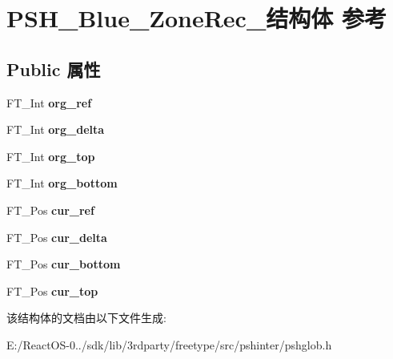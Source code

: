 \hypertarget{struct_p_s_h___blue___zone_rec__}{}\section{P\+S\+H\+\_\+\+Blue\+\_\+\+Zone\+Rec\+\_\+结构体 参考}
\label{struct_p_s_h___blue___zone_rec__}
\subsection*{Public 属性}
\begin{DoxyCompactItemize}
\item 
\mbox{\label{struct_p_s_h___blue___zone_rec___ad6c98c1b6398f757725cc8d900339ee9}} 
F\+T\+\_\+\+Int {\bfseries org\+\_\+ref}
\item 
\mbox{\label{struct_p_s_h___blue___zone_rec___a4bf88ac8d5d5fea2946686e57e3e6d75}} 
F\+T\+\_\+\+Int {\bfseries org\+\_\+delta}
\item 
\mbox{\label{struct_p_s_h___blue___zone_rec___a62dac7f5e8d472ea47a1a9ec962f4b01}} 
F\+T\+\_\+\+Int {\bfseries org\+\_\+top}
\item 
\mbox{\label{struct_p_s_h___blue___zone_rec___af09f51397360e614f909802e5fa29575}} 
F\+T\+\_\+\+Int {\bfseries org\+\_\+bottom}
\item 
\mbox{\label{struct_p_s_h___blue___zone_rec___a7801228789920539914ef05fda7f0c6c}} 
F\+T\+\_\+\+Pos {\bfseries cur\+\_\+ref}
\item 
\mbox{\label{struct_p_s_h___blue___zone_rec___a73b836869930f314651dfd42a42ddfcc}} 
F\+T\+\_\+\+Pos {\bfseries cur\+\_\+delta}
\item 
\mbox{\label{struct_p_s_h___blue___zone_rec___a0aefe85c9fe5aed2ff60b5e7f204ca9b}} 
F\+T\+\_\+\+Pos {\bfseries cur\+\_\+bottom}
\item 
\mbox{\label{struct_p_s_h___blue___zone_rec___a24412f1d3e29e588387b65912a4f948c}} 
F\+T\+\_\+\+Pos {\bfseries cur\+\_\+top}
\end{DoxyCompactItemize}


该结构体的文档由以下文件生成\+:\begin{DoxyCompactItemize}
\item 
E\+:/\+React\+O\+S-\/0../sdk/lib/3rdparty/freetype/src/pshinter/pshglob.\+h\end{DoxyCompactItemize}
